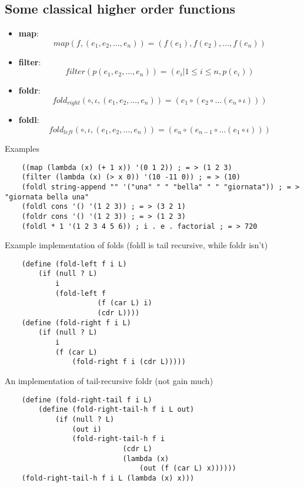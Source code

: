 \subsection{Some classical higher order functions}
\begin{itemize}
    \item \textbf{map}: \begin{equation} map(f,(e_1,e_2,\ldots,e_n)) = (f(e_1),f(e_2),\ldots,f(e_n)) \end{equation}
    \item \textbf{filter}: \begin{equation} filter(p(e_1,e_2,\ldots,e_n)) = (e_i|1\leq i\leq n,p(e_i)) \end{equation}
    \item \textbf{foldr}: \begin{equation} fold_{right}(\circ ,\iota,(e_1,e_2,\ldots,e_n)) = (e_1\circ(e_2\circ\ldots(e_n\circ\iota))) \end{equation}
    \item \textbf{foldl}: \begin{equation} fold_{left}(\circ ,\iota,(e_1,e_2,\ldots,e_n)) = (e_n\circ(e_{n-1}\circ\ldots(e_1\circ\iota))) \end{equation}
\end{itemize}
Examples
\begin{lstlisting}
    ((map (lambda (x) (+ 1 x)) '(0 1 2)) ; = > (1 2 3)
    (filter (lambda (x) (> x 0)) '(10 -11 0)) ; = > (10)
    (foldl string-append "" '("una" " " "bella" " " "giornata")) ; = > "giornata bella una"
    (foldl cons '() '(1 2 3)) ; = > (3 2 1)
    (foldr cons '() '(1 2 3)) ; = > (1 2 3)
    (foldl * 1 '(1 2 3 4 5 6)) ; i . e . factorial ; = > 720
\end{lstlisting}
Example implementation of folds (foldl is tail recursive, while foldr isn’t)
\begin{lstlisting}
    (define (fold-left f i L)
        (if (null ? L)
            i
            (fold-left f
                      (f (car L) i)
                      (cdr L))))
    (define (fold-right f i L)
        (if (null ? L)
            i
            (f (car L)
                (fold-right f i (cdr L)))))
\end{lstlisting}
An implementation of tail-recursive foldr (not gain much)
\begin{lstlisting}
    (define (fold-right-tail f i L)
        (define (fold-right-tail-h f i L out)
            (if (null ? L)
                (out i)
                (fold-right-tail-h f i
                            (cdr L)
                            (lambda (x)
                                (out (f (car L) x))))))
    (fold-right-tail-h f i L (lambda (x) x)))
\end{lstlisting}

